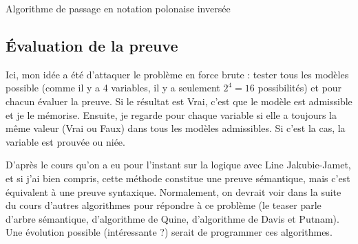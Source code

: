 \documentclass[12pt, algo]{cours}
\begin{document}
\begin{algorithm}
\caption{Algorithme de passage en notation polonaise inversée}
\label{Shunting-yard}
\end{algorithm}

\subsection{Évaluation de la preuve}

Ici, mon idée a été d'attaquer le problème en force brute : tester tous les modèles possible (comme il y a 4 variables, il y a seulement $2^4=16$ possibilités) et pour chacun évaluer la preuve. Si le résultat est Vrai, c'est que le modèle est admissible et je le mémorise. Ensuite, je regarde pour chaque variable si elle a toujours la même valeur (Vrai ou Faux) dans tous les modèles admissibles. Si c'est la cas, la variable est prouvée ou niée.

\medskip
D'après le cours qu'on a eu pour l'instant sur la logique avec Line Jakubie-Jamet, et si j'ai bien compris, cette méthode constitue une preuve sémantique, mais c'est équivalent à une preuve syntaxique. Normalement, on devrait voir dans la suite du cours d'autres algorithmes pour répondre à ce problème (le teaser parle d'arbre sémantique, d'algorithme de Quine, d'algorithme de Davis et Putnam). Une évolution possible (intéressante ?) serait de programmer ces algorithmes.

\medskip
\end{document}
